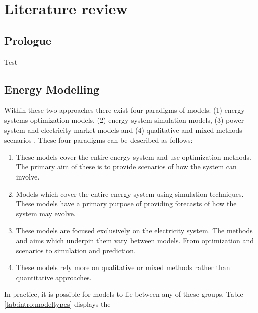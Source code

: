 \chapter{Literature review}
\label{chapter:litreview}
\ifpdf
    \graphicspath{{Chapter3/Figs/Raster/}{Chapter3/Figs/PDF/}{Chapter3/Figs/}}
\else
    \graphicspath{{Chapter3/Figs/Vector/}{Chapter3/Figs/}}
\fi

\section*{Prologue}

Test

\section{Energy Modelling}

Within these two approaches there exist four paradigms of models: (1) energy systems optimization models, (2) energy system simulation models, (3) power system and electricity market models and (4) qualitative and mixed methods scenarios \cite{Pfenninger2014a}. These four paradigms can be described as follows:

\begin{enumerate}
	\item These models cover the entire energy system and use optimization methods. The primary aim of these is to provide scenarios of how the system can involve.
	\item Models which cover the entire energy system using simulation techniques. These models have a primary purpose of providing forecasts of how the system may evolve.
	\item These models are focused exclusively on the electricity system. The methods and aims which underpin them vary between models. From optimization and scenarios to simulation and prediction.
	\item These models rely more on qualitative or mixed methods rather than quantitative approaches.
\end{enumerate}

In practice, it is possible for models to lie between any of these groups. Table \ref{tab:intro:modeltypes} displays the 


